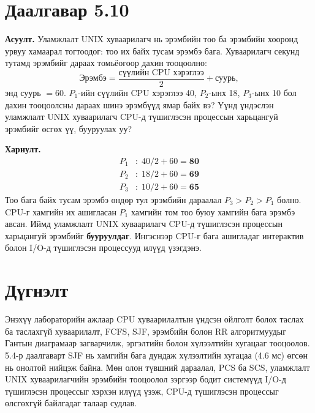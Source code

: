 \documentclass[12pt,a4paper]{article}
\newcommand{\q}[1]{\par\noindent\textbf{Асуулт.} #1\par}
\newcommand{\ans}{\par\noindent\textbf{Хариулт.} }
\begin{document}
\section{Даалгавар 5.10}
\q{Уламжлалт UNIX хуваарилагч нь эрэмбийн тоо ба эрэмбийн хооронд урвуу хамаарал тогтоодог: тоо их байх тусам эрэмбэ бага. Хуваарилагч секунд тутамд эрэмбийг дараах томьёогоор дахин тооцоолно:
\[
\text{Эрэмбэ} = \frac{\text{сүүлийн CPU хэрэглээ}}{2} + \text{суурь},
\]
энд суурь $= 60$. $P_1$-ийн сүүлийн CPU хэрэглээ 40, $P_2$-ынх 18, $P_3$-ынх 10 бол дахин тооцоолсны дараах шинэ эрэмбүүд ямар байх вэ? Үүнд үндэслэн уламжлалт UNIX хуваарилагч CPU-д түшиглэсэн процессын харьцангуй эрэмбийг өсгөх үү, бууруулах уу?}
\ans
\begin{align*}
P_1 &: \; 40/2 + 60 = \mathbf{80}\\
P_2 &: \; 18/2 + 60 = \mathbf{69}\\
P_3 &: \; 10/2 + 60 = \mathbf{65}
\end{align*}
Тоо бага байх тусам эрэмбэ өндөр тул эрэмбийн дараалал $P_3 > P_2 > P_1$ болно. CPU-г хамгийн их ашигласан $P_1$ хамгийн том тоо буюу хамгийн бага эрэмбэ авсан. Иймд уламжлалт UNIX хуваарилагч CPU-д түшиглэсэн процессын харьцангуй эрэмбийг \textbf{бууруулдаг}. Ингэснээр CPU-г бага ашигладаг интерактив болон I/O-д түшиглэсэн процессууд илүүд үзэгдэнэ.

\section{Дүгнэлт}
Энэхүү лабораторийн ажлаар CPU хуваарилалтын үндсэн ойлголт болох таслах ба таслахгүй хуваарилалт, FCFS, SJF, эрэмбийн болон RR алгоритмуудыг Гантын диаграмаар загварчилж, эргэлтийн болон хүлээлтийн хугацааг тооцоолов. 5.4-р даалгаварт SJF нь хамгийн бага дундаж хүлээлтийн хугацаа (4.6 мс) өгсөн нь онолтой нийцэж байна. Мөн олон түвшний дараалал, PCS ба SCS, уламжлалт UNIX хуваарилагчийн эрэмбийн тооцоолол зэргээр бодит системүүд I/O-д түшиглэсэн процессыг хэрхэн илүүд үзэж, CPU-д түшиглэсэн процессыг өлсгөхгүй байлгадаг талаар судлав.
\end{document}
